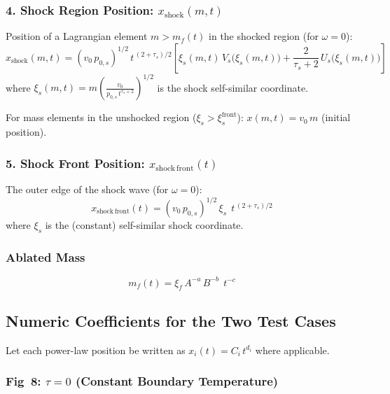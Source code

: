 \documentclass[11pt]{article}
\begin{document}
\subsubsection{4. Shock Region Position: $x_{\mathrm{shock}}(m,t)$}

Position of a Lagrangian element $m > m_f(t)$ in the shocked region (for $\omega=0$):
\begin{equation}
  \boxed{
  x_{\mathrm{shock}}(m,t)
  = \left(v_0\,p_{0,s}\right)^{1/2}\,t^{\,(2+\tau_s)/2}
    \left[\xi_s(m,t)\,V_s\!\bigl(\xi_s(m,t)\bigr)
    + \frac{2}{\tau_s+2}\,U_s\!\bigl(\xi_s(m,t)\bigr)\right]}
  \label{eq:x_shock}
\end{equation}
where $\xi_s(m,t) = m\left(\frac{v_0}{p_{0,s}\,t^{\tau_s+2}}\right)^{1/2}$ is the shock self-similar coordinate.

For mass elements in the unshocked region ($\xi_s > \xi_s^{\mathrm{front}}$): $x(m,t) = v_0\,m$ (initial position).

\subsubsection{5. Shock Front Position: $x_{\mathrm{shock\,front}}(t)$}

The outer edge of the shock wave (for $\omega=0$):
\begin{equation}
  \boxed{
  x_{\mathrm{shock\,front}}(t) = \left(v_0\,p_{0,s}\right)^{1/2}\,\xi_s\;\,t^{\,(2+\tau_s)/2}}
  \label{eq:x_shock_front}
\end{equation}
where $\xi_s$ is the (constant) self-similar shock coordinate.

\subsubsection{Ablated Mass}
\begin{equation}
  m_f(t) = \xi_f\,A^{-a}\,B^{-b}\;\,t^{-c}
  \label{eq:mf_explicit}
\end{equation}

\subsection{Numeric Coefficients for the Two Test Cases}

Let each power-law position be written as $x_i(t) = C_i\,t^{d_i}$ where applicable.

\subsubsection{Fig~8: $\tau=0$ (Constant Boundary Temperature)}
\end{document}
